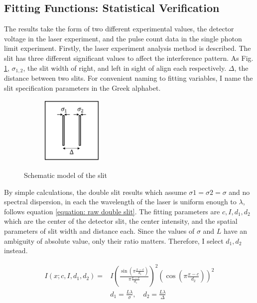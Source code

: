 \documentclass{article}
\begin{document}
\subsection{Fitting Functions: Statistical Verification}
\label{intro: statistical_setup_fitting_method}
 The results take the form of two different experimental values, the detector voltage in the laser experiment, and the pulse count data in the single photon limit experiment.
 Firstly, the laser experiment analysis method is described.
 The slit has three different significant values to affect the interference pattern.
 As Fig. \ref{fig: slit_specs}, $\sigma_{1,2}$, the slit width of right, and left in sight of align each respectively. $\Delta$, the distance between two slits.
 For convenient naming to fitting variables, I name the slit specification parameters in the Greek alphabet.
 \begin{figure}[H]
    \centering
    \begin{subfigure}[b]{7cm}
        \centering
        \includegraphics[width=3cm]{../results/slit_specs.png}
        \caption{}
    \end{subfigure}
    \hfill
    \caption{Schematic model of the slit}
    \label{fig: slit_specs}
\end{figure}
 By simple calculations, the double slit results which assume $\sigma1 = \sigma2 = \sigma$ and no spectral dispersion, in each the wavelength of the laser is uniform enough to $\lambda$, follows equation \ref{equation: raw double slit}.
 The fitting parameters are $c, I, d_1, d_2$ which are the center of the detector slit, the center intensity, and the spatial parameters of slit width and distance each.
 Since the values of $\sigma$ and $L$ have an ambiguity of absolute value, only their ratio matters.
 Therefore, I select $d_1, d_2$ instead.


 \begin{align}
     I(x;c,I,d_1,d_2) = &I \left( \frac{\sin(\pi \frac{x-c}{d_1})}{\pi \frac{x-c}{d_1}} \right)^2 (\cos(\pi \frac{x-c}{d_2}))^2  \nonumber \\
     &d_1 = \frac{L \lambda}{\sigma}, \quad d_2 = \frac{L \lambda}{\Delta}  \label{equation: raw double slit}
 \end{align}
\end{document}
